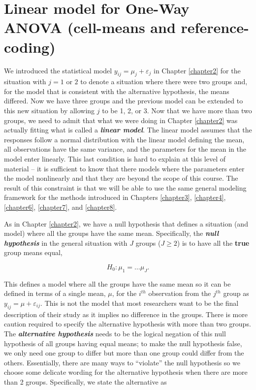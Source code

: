 \documentclass[]{book}
\theoremstyle{definition}
\theoremstyle{definition}
\theoremstyle{remark}
\begin{document}
\section{Linear model for One-Way ANOVA (cell-means and
reference-coding)}\label{section3-2}

We introduced the statistical model \(y_{ij} = \mu_j+\varepsilon_j\) in
Chapter \ref{chapter2} for the situation with \(j = 1 \text{ or } 2\) to
denote a situation where there were two groups and, for the model that
is consistent with the alternative hypothesis, the means differed. Now
we have three groups and the previous model can be extended to this new
situation by allowing \(j\) to be 1, 2, or 3. Now that we have more than
two groups, we need to admit that what we were doing in Chapter
\ref{chapter2} was actually fitting what is called a
\textbf{\emph{linear model}}. The linear model assumes that the
responses follow a normal distribution with the linear model defining
the mean, all observations have the same variance, and the parameters
for the mean in the model enter linearly. This last condition is hard to
explain at this level of material -- it is sufficient to know that there
models where the parameters enter the model nonlinearly and that they
are beyond the scope of this course. The result of this constraint is
that we will be able to use the same general modeling framework for the
methods introduced in Chapters \ref{chapter3}, \ref{chapter4},
\ref{chapter6}, \ref{chapter7}, and \ref{chapter8}.

As in Chapter \ref{chapter2}, we have a null hypothesis that defines a
situation (and model) where all the groups have the same mean.
Specifically, the \textbf{\emph{null hypothesis}} in the general
situation with \(J\) groups (\(J\ge 2\)) is to have all the
\textbf{true} group means equal,

\[H_0:\mu_1 = \ldots \mu_J.\]

This defines a model where all the groups have the same mean so it can
be defined in terms of a single mean, \(\mu\), for the \(i^{th}\)
observation from the \(j^{th}\) group as
\(y_{ij} = \mu+\varepsilon_{ij}\). This is not the model that most
researchers want to be the final description of their study as it
implies no difference in the groups. There is more caution required to
specify the alternative hypothesis with more than two groups. The
\textbf{\emph{alternative hypothesis}} needs to be the logical negation
of this null hypothesis of all groups having equal means; to make the
null hypothesis false, we only need one group to differ but more than
one group could differ from the others. Essentially, there are many ways
to ``violate'' the null hypothesis so we choose some delicate wording
for the alternative hypothesis when there are more than 2 groups.
Specifically, we state the alternative as
\end{document}
